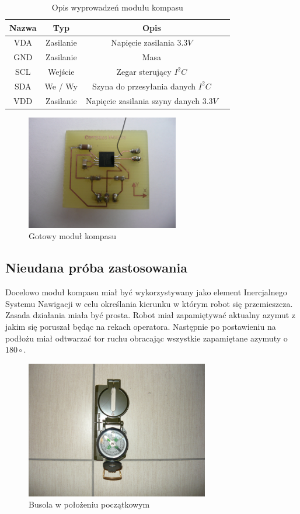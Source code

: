 \begin{table}[hb]
  \centering
  \caption{Opis wyprowadzeń modułu kompasu}
  \begin{tabular}{ | c | c | c | p{1.75cm} |} \hline
    Nazwa & Typ & Opis \\ \hline
    VDA & Zasilanie & Napięcie zasilania $3.3V$ \\
    GND & Zasilanie & Masa \\
    SCL & Wejście & Zegar sterujący $I^{2}C$ \\
    SDA & We / Wy & Szyna do przesyłania danych $I^{2}C$ \\
    VDD & Zasilanie & Napięcie zasilania szyny danych $3.3V$ \\ \hline
  \end{tabular}
  \label{tab:MMC2120ModOut}
\end{table}

\begin{figure}[!ht]
 \centering
 \includegraphics[height=50mm]{../images/ch04/compassmodule.jpg}
 \caption{Gotowy moduł kompasu}
 \label{fig:MMC2120Module}
\end{figure}

\subsection{Nieudana próba zastosowania}
Docelowo moduł kompasu miał być wykorzystywany jako element Inercjalnego Systemu Nawigacji w celu określania kierunku w którym robot się przemieszcza. Zasada działania miała być prosta. Robot miał zapamiętywać aktualny azymut z jakim się poruszał będąc na rekach operatora. Następnie po postawieniu na podłożu miał odtwarzać tor ruchu obracając wszystkie zapamiętane azymuty o $180\circ$. 

\begin{figure}[!ht]
 \centering
 \includegraphics[height=60mm]{../images/ch04/compass01.jpg}
 \caption{Busola w położeniu początkowym}
 \label{fig:Busola1}
\end{figure}

